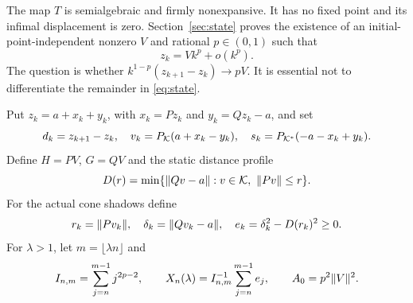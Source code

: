 \documentclass[11pt]{article}
\theoremstyle{remark}\newtheorem{remark}[theorem]{Remark}
\numberwithin{equation}{section}
\begin{document}
The map $T$ is semialgebraic and firmly nonexpansive. It has no fixed point and its infimal displacement is zero. Section~\ref{sec:state} proves the existence of an initial-point-independent nonzero $V$ and rational $p\in(0,1)$ such that
\begin{equation}\label{eq:state}
 z_k=Vk^p+o(k^p).
\end{equation}
The question is whether $k^{1-p}(z_{k+1}-z_k)\to pV$. It is essential not to differentiate the remainder in \eqref{eq:state}.

Put $z_k=a+x_k+y_k$, with $x_k=Pz_k$ and $y_k=Qz_k-a$, and set
\begin{equation}\label{eq:shadows}
 d_k=z_{k+1}-z_k,\quad v_k=P_\mathcal K(a+x_k-y_k),\quad
 s_k=P_{\mathcal K^*}(-a-x_k+y_k).
\end{equation}
Define $H=PV$, $G=QV$ and the static distance profile
\begin{equation}\label{eq:profile}
 D(r)=\min\{\lVert Qv-a\rVert:v\in\mathcal K,\ \lVert Pv\rVert\leq r\}.
\end{equation}
For the actual cone shadows define
\begin{equation}\label{eq:excess}
 r_k=\lVert Pv_k\rVert,\quad \delta_k=\lVert Qv_k-a\rVert,\quad
 e_k=\delta_k^2-D(r_k)^2\geq0.
\end{equation}
For $\lambda>1$, let $m=\lfloor\lambda n\rfloor$ and
\[
 I_{n,m}=\sum_{j=n}^{m-1}j^{2p-2},\qquad
 X_n(\lambda)=I_{n,m}^{-1}\sum_{j=n}^{m-1}e_j,
 \qquad A_0=p^2\lVert V\rVert^2.
\]
\end{document}
